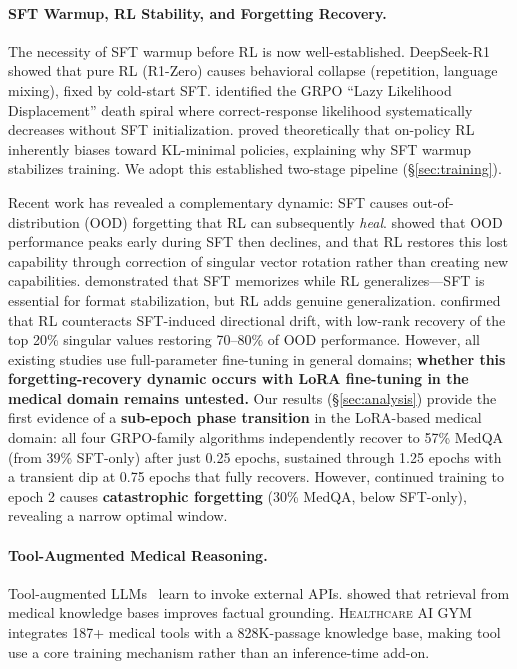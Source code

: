 \documentclass{article}
\newcommand{\gym}{\textsc{Healthcare AI GYM}}
\begin{document}
\paragraph{SFT Warmup, RL Stability, and Forgetting Recovery.}
The necessity of SFT warmup before RL is now well-established. DeepSeek-R1~\citep{deepseekr1} showed that pure RL (R1-Zero) causes behavioral collapse (repetition, language mixing), fixed by cold-start SFT. \citet{deng2025lld} identified the GRPO ``Lazy Likelihood Displacement'' death spiral where correct-response likelihood systematically decreases without SFT initialization. \citet{rlrazor2025} proved theoretically that on-policy RL inherently biases toward KL-minimal policies, explaining why SFT warmup stabilizes training. We adopt this established two-stage pipeline (\S\ref{sec:training}).

Recent work has revealed a complementary dynamic: SFT causes out-of-distribution (OOD) forgetting that RL can subsequently \emph{heal}. \citet{jin2025rlheals} showed that OOD performance peaks early during SFT then declines, and that RL restores this lost capability through correction of singular vector rotation rather than creating new capabilities. \citet{chu2025sftrl} demonstrated that SFT memorizes while RL generalizes---SFT is essential for format stabilization, but RL adds genuine generalization. \citet{song2025rlpanacea} confirmed that RL counteracts SFT-induced directional drift, with low-rank recovery of the top 20\% singular values restoring 70--80\% of OOD performance. However, all existing studies use full-parameter fine-tuning in general domains; \textbf{whether this forgetting-recovery dynamic occurs with LoRA fine-tuning in the medical domain remains untested.} Our results (\S\ref{sec:analysis}) provide the first evidence of a \textbf{sub-epoch phase transition} in the LoRA-based medical domain: all four GRPO-family algorithms independently recover to 57\% MedQA (from 39\% SFT-only) after just 0.25 epochs, sustained through 1.25 epochs with a transient dip at 0.75 epochs that fully recovers. However, continued training to epoch 2 causes \textbf{catastrophic forgetting} (30\% MedQA, below SFT-only), revealing a narrow optimal window.

\paragraph{Tool-Augmented Medical Reasoning.}
Tool-augmented LLMs~\citep{schick2024toolformer, qin2023toolllm} learn to invoke external APIs. \citet{xiong2024medcpt} showed that retrieval from medical knowledge bases improves factual grounding. \gym{} integrates 187+ medical tools with a 828K-passage knowledge base, making tool use a core training mechanism rather than an inference-time add-on.
\end{document}
